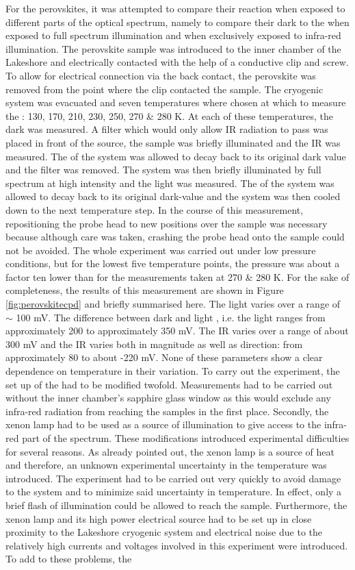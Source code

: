 For the perovskites, it was attempted to compare their reaction when exposed to different parts of the optical spectrum, namely to compare their dark \cpd{} to the \cpd{} when exposed to full spectrum illumination and when exclusively exposed to infra-red illumination. The perovskite sample was introduced to the inner chamber of the Lakeshore and electrically contacted with the help of a conductive clip and screw. To allow for electrical connection via the back contact, the perovskite was removed from the point where the clip contacted the sample. The cryogenic system was evacuated and seven temperatures where chosen at which to measure the \cpd{}: 130, 170, 210, 230, 250, 270 \& 280 K. At each of these temperatures, the dark \cpd{} was measured. A filter which would only allow IR radiation to pass was placed in front of the source, the sample was briefly illuminated and the IR \cpd{} was measured. The \cpd{} of the system was allowed to decay back to its original dark value and the filter was removed. The system was then briefly illuminated by full spectrum at high intensity and the light \cpd{} was measured. The \cpd{} of the system was allowed to decay back to its original dark-value and the system was then cooled down to the next temperature step. In the course of this measurement, repositioning the probe head to new positions over the sample was necessary because although care was taken, crashing the probe head onto the sample could not be avoided. The whole experiment was carried out under low pressure conditions, but for the lowest five temperature points, the pressure was about a factor ten lower than for the measurements taken at 270 \& 280 K. For the sake of completeness, the results of this measurement are shown in Figure \ref{fig:perovskitecpd} and briefly summarised here. The light \cpd{} varies over a range of $\sim$ 100 mV. The difference between dark and light \cpd{}, i.e. the light \spv{} ranges from approximately 200 to approximately 350 mV. The IR \cpd{} varies over a range of about 300 mV and the IR \spv{} varies both in magnitude as well as direction: from approximately 80 to about -220 mV. None of these parameters show a clear dependence on temperature in their variation. To carry out the experiment, the set up of the \McA{} had to be modified twofold. Measurements had to be carried out without the inner chamber's sapphire glass window as this would exclude any infra-red radiation from reaching the samples in the first place. Secondly, the xenon lamp had to be used as a source of illumination to give access to the infra-red part of the spectrum. These modifications introduced experimental difficulties for several reasons. As already pointed out, the xenon lamp is a source of heat and therefore, an unknown experimental uncertainty in the temperature was introduced. The experiment had to be carried out very quickly to avoid damage to the system and to minimize said uncertainty in temperature. In effect, only a brief flash of illumination could be allowed to reach the sample. Furthermore, the xenon lamp and its high power electrical source had to be set up in close proximity to the Lakeshore cryogenic system and electrical noise due to the relatively high currents and voltages involved in this experiment were introduced. To add to these problems, the 